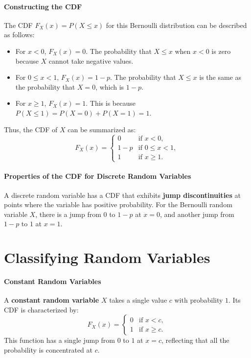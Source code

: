     \paragraph{Constructing the CDF}
    The CDF \( F_X(x) = P(X \leq x) \) for this Bernoulli distribution can be described as follows:
    \begin{itemize}
        \item For \( x < 0 \), \( F_X(x) = 0 \). The probability that \( X \leq x \) when \( x < 0 \) is zero because \( X \) cannot take negative values.
        \item For \( 0 \leq x < 1 \), \( F_X(x) = 1 - p \). The probability that \( X \leq x \) is the same as the probability that \( X = 0 \), which is \( 1 - p \).
        \item For \( x \geq 1 \), \( F_X(x) = 1 \). This is because \( P(X \leq 1) = P(X = 0) + P(X = 1) = 1 \).
    \end{itemize}
    Thus, the CDF of \( X \) can be summarized as:
    \[
    F_X(x) =
    \begin{cases}
    0 & \text{if } x < 0, \\
    1 - p & \text{if } 0 \leq x < 1, \\
    1 & \text{if } x \geq 1.
    \end{cases}
    \]
    
    \paragraph{Properties of the CDF for Discrete Random Variables}
    
    A discrete random variable has a CDF that exhibits \textbf{jump discontinuities} at points where the variable has positive probability. For the Bernoulli random variable \( X \), there is a jump from \( 0 \) to \( 1 - p \) at \( x = 0 \), and another jump from \( 1 - p \) to \( 1 \) at \( x = 1 \). 
    
    \section{Classifying Random Variables}
    
    \paragraph{Constant Random Variables}
    
    A \textbf{constant random variable} \( X \) takes a single value \( c \) with probability \( 1 \). Its CDF is characterized by:
    \[
    F_X(x) =
    \begin{cases}
    0 & \text{if } x < c, \\
    1 & \text{if } x \geq c.
    \end{cases}
    \]
    This function has a single jump from \( 0 \) to \( 1 \) at \( x = c \), reflecting that all the probability is concentrated at \( c \).
    
